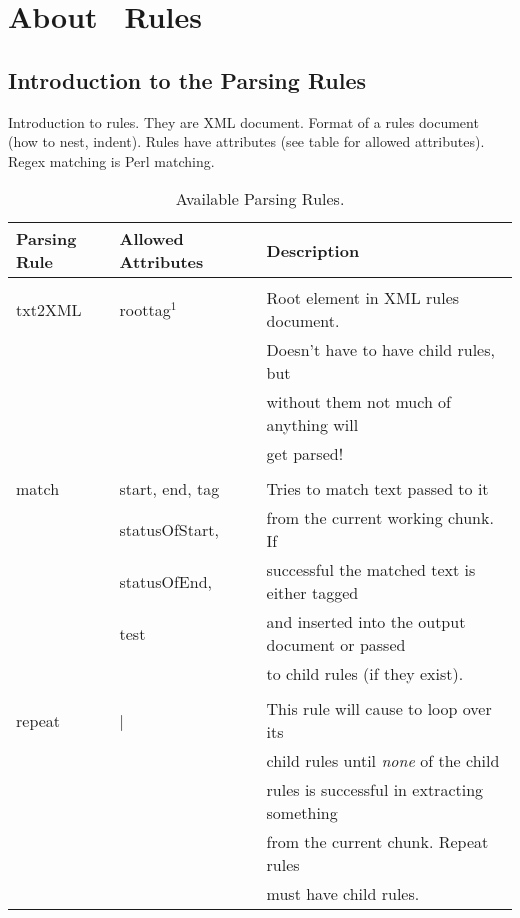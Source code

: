 
\chapter{About \program\ Rules}

\section{Introduction to the Parsing Rules} 
\label{sec:rules_def}

Introduction to rules. They are XML document. 
Format of a rules document (how to nest, indent).
Rules have attributes (see table for allowed attributes).
Regex matching is Perl matching.  

{\small
\begin{table}
 \begin{center}
 \caption{Available Parsing Rules.}
 \label{tab:parsing_rules}
  \vskip 12pt
  \begin{tabular}{|lll|} \hline
Parsing Rule & Allowed Attributes & Description \\ \hline\hline
 & & \\
txt2XML & roottag$^{1}$ & Root element in XML rules document. \\ 
 & & Doesn't have to have child rules, but \\
 & & without them not much of anything will \\
 & & get parsed! \\
 & & \\
match & start, end, tag &  Tries to match text passed to it \\
 & statusOfStart, & from the current working chunk. If \\
 & statusOfEnd, & successful the matched text is either tagged\\
 & test & and inserted into the output document or passed \\
 & & to child rules (if they exist). \\
 & & \\
repeat & | & This rule will cause to loop over its  \\
 & & child rules until {\em none} of the child \\
 & & rules is successful in extracting something \\
 & & from the current chunk. Repeat rules \\
 & & must have child rules. \\

\end{tabular}
\end{center}
\end{table}}
